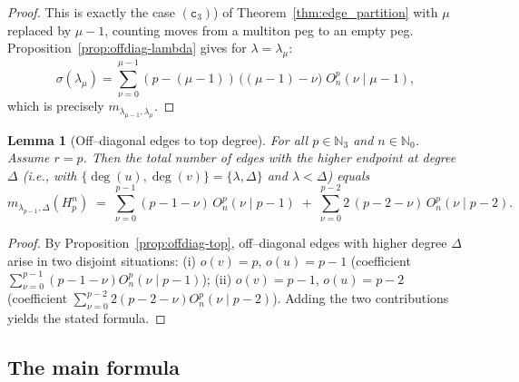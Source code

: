 \documentclass[letterpaper,12pt]{article}
\newtheorem{lemma}{Lemma}
\begin{document}
\begin{proof}
This is exactly the case $(\texttt{c}_{3})$) of Theorem~\ref{thm:edge_partition} with $\mu$ replaced by $\mu-1$,
counting moves from a multiton peg to an empty peg.  Proposition~\ref{prop:offdiag-lambda}  gives for $\lambda=\lambda_\mu$:
\[
\sigma(\lambda_\mu)
=
\sum_{\nu=0}^{\mu-1} (p-(\mu-1))\,\big((\mu-1)-\nu\big)\; O_n^p(\nu\mid \mu-1),
\]
which is precisely $m_{\lambda_{\mu-1},\lambda_\mu}$.
\end{proof}

\begin{lemma}[Off–diagonal edges to top degree]
\label{lem:offdiag-top}
For all $p \in \mathbb{N}_3$ and $n \in \mathbb{N}_0$. Assume $r=p$. Then the total number of edges with the higher endpoint at degree $\Delta$
(i.e., with $\{\deg(u),\deg(v)\}=\{\lambda,\Delta\}$ and $\lambda<\Delta$) equals
\begin{equation}
    m_{\lambda_{p-1},\Delta}(H_p^n)
\;=\;
\sum_{\nu=0}^{p-1}(p-1-\nu)\,O_n^p(\nu\mid p-1)
\;+\;
\sum_{\nu=0}^{p-2} 2\,(p-2-\nu)\,O_n^p(\nu\mid p-2).
\end{equation}
\end{lemma}

\begin{proof}
By Proposition~\ref{prop:offdiag-top}, off–diagonal edges with higher degree
$\Delta$ arise in two disjoint situations:
(i) $o(v)=p$, $o(u)=p-1$ (coefficient $\sum_{\nu=0}^{p-1}(p-1-\nu)O_n^p(\nu\mid p-1)$);
(ii) $o(v)=p-1$, $o(u)=p-2$ (coefficient $\sum_{\nu=0}^{p-2}2(p-2-\nu)O_n^p(\nu\mid p-2)$).
Adding the two contributions yields the stated formula.
\end{proof}

\subsection*{The main formula}

 
\end{document}
